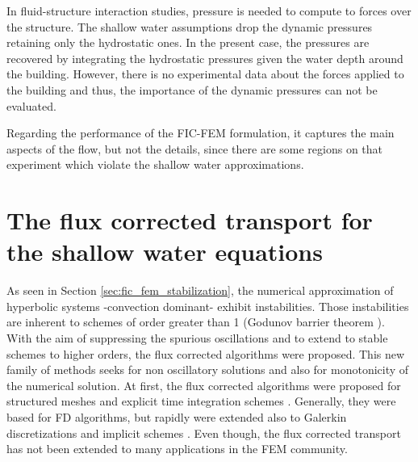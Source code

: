 In fluid-structure interaction studies, pressure is needed to compute to forces over the structure. The shallow water assumptions drop the dynamic pressures retaining only the hydrostatic ones. In the present case, the pressures are recovered by integrating the hydrostatic pressures given the water depth around the building. However, there is no experimental data about the forces applied to the building and thus, the importance of the dynamic pressures can not be evaluated.


Regarding the performance of the FIC-FEM formulation, it captures the main aspects of the flow, but not the details, since there are some regions on that experiment which violate the shallow water approximations.










\section{The flux corrected transport for the shallow water equations}
\label{sec:sw_fc}



As seen in Section \ref{sec:fic_fem_stabilization}, the numerical approximation of hyperbolic systems -convection dominant- exhibit instabilities. Those instabilities are inherent to schemes of order greater than 1 (Godunov barrier theorem \cite{godunov1959}). With the aim of suppressing the spurious oscillations and to extend to stable schemes to higher orders, the flux corrected algorithms were proposed.
This new family of methods seeks for non oscillatory solutions and also for monotonicity of the numerical solution. At first, the flux corrected algorithms were proposed for structured meshes and explicit time integration schemes \cite{boris1973, book1975}. Generally, they were based for FD algorithms, but rapidly were extended also to Galerkin discretizations and implicit schemes \cite{kuzmin2001, lohner2008ch9}. Even though, the flux corrected transport has not been extended to many applications in the FEM community.


